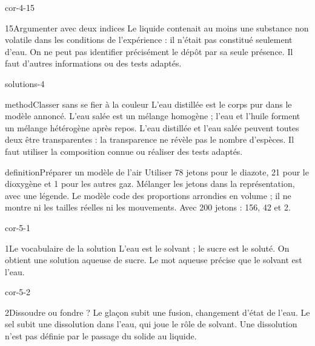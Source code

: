 \documentclass[12pt,twoside,openany]{book}
\begin{document}
\begin{blocLivre}{cor-4-15}
\begin{corrige}{15}{Argumenter avec deux indices}
Le liquide contenait au moins une substance non volatile dans les conditions de l’expérience : il n’était pas constitué seulement d’eau. On ne peut pas identifier précisément le dépôt par sa seule présence. Il faut d’autres informations ou des tests adaptés.\par
\end{corrige}\end{blocLivre}
\label{solutions-4}
\begin{pcFiche}{solutions-4}
\begin{pcEncadre}{method}{Classer sans se fier à la couleur}
L’eau distillée est le corps pur dans le modèle annoncé. L’eau salée est un mélange homogène ; l’eau et l’huile forment un mélange hétérogène après repos. L’eau distillée et l’eau salée peuvent toutes deux être transparentes : la transparence ne révèle pas le nombre d’espèces. Il faut utiliser la composition connue ou réaliser des tests adaptés.\par
\end{pcEncadre}
\label{defi-cor-4}
\begin{pcEncadre}{definition}{Préparer un modèle de l’air}
Utiliser 78 jetons pour le diazote, 21 pour le dioxygène et 1 pour les autres gaz. Mélanger les jetons dans la représentation, avec une légende. Le modèle code des proportions arrondies en volume ; il ne montre ni les tailles réelles ni les mouvements. Avec 200 jetons : 156, 42 et 2.\par
\end{pcEncadre}
\end{pcFiche}
\clearpage{}
\begin{blocLivre}{cor-5-1}
\begin{corrige}{1}{Le vocabulaire de la solution}
L’eau est le solvant ; le sucre est le soluté. On obtient une solution aqueuse de sucre. Le mot aqueuse précise que le solvant est l’eau.\par
\end{corrige}\end{blocLivre}
\begin{blocLivre}{cor-5-2}
\begin{corrige}{2}{Dissoudre ou fondre ?}
Le glaçon subit une fusion, changement d’état de l’eau. Le sel subit une dissolution dans l’eau, qui joue le rôle de solvant. Une dissolution n’est pas définie par le passage du solide au liquide.\par
\end{corrige}\end{blocLivre}
\end{document}
